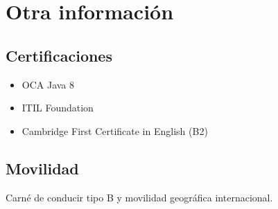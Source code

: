 \documentclass[letterpaper]{twentysecondcv} %
\begin{document}
\section{Otra información}
\subsection{Certificaciones}
\begin{itemize}
\item OCA Java 8
\item ITIL Foundation
\item Cambridge First Certificate in English (B2)
\end{itemize}
\subsection{Movilidad}
Carné de conducir tipo B y movilidad geográfica internacional.







\end{document}

